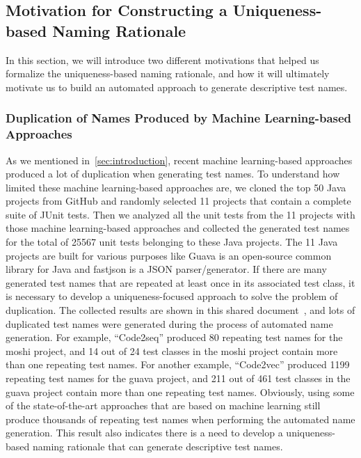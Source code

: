 \subsection{Motivation for Constructing a Uniqueness-based Naming Rationale}

In this section, we will introduce two different motivations that helped us formalize the uniqueness-based naming rationale, and how it will ultimately motivate us to build an automated approach to generate descriptive test names.

\subsubsection{Duplication of Names Produced by Machine Learning-based Approaches}
\label{sec:duplication-names}

As we mentioned in~\cref{sec:introduction}, recent machine learning-based approaches produced a lot of duplication when generating test names.
%
To understand how limited these machine learning-based approaches are, we cloned the top \num{50} Java projects from GitHub and randomly selected \num{11} projects that contain a complete suite of JUnit tests.
%
Then we analyzed all the unit tests from the \num{11} projects with those machine learning-based approaches and collected the generated test names for the total of \num{25567} unit tests belonging to these Java projects.
%
The \num{11} Java projects are built for various purposes like Guava is an open-source common library for Java and fastjson is a JSON parser\slash generator.
%
If there are many generated test names that are repeated at least once in its associated test class, it is necessary to develop a uniqueness-focused approach to solve the problem of duplication.
%
The collected results are shown in this shared document~\cite{CodeResult}, and lots of duplicated test names were generated during the process of automated name generation. 
%
For example, \enquote{Code2seq} produced \num{80} repeating test names for the moshi project, and \num{14} out of \num{24} test classes in the moshi project contain more than one repeating test names.
%
For another example, \enquote{Code2vec} produced \num{1199} repeating test names for the guava project, and \num{211} out of \num{461} test classes in the guava project contain more than one repeating test names.
%
Obviously, using some of the state-of-the-art approaches that are based on machine learning still produce thousands of repeating test names when performing the automated name generation.
%
This result also indicates there is a need to develop a uniqueness-based naming rationale that can generate descriptive test names.



